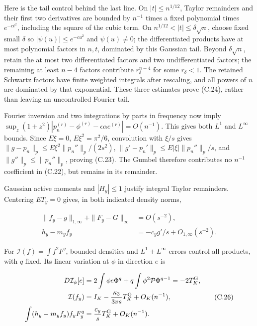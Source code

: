 \documentclass{article}
\begin{document}
Here is the tail control behind the last line. On \(|t|\le n^{1/12}\),
Taylor remainders and their first two derivatives are bounded by
\(n^{-1}\) times a fixed polynomial times \(e^{-ct^2}\), including the
square of the cubic term. On \(n^{1/12}<|t|\le\delta\sqrt n\), choose
fixed small \(\delta\) so \(|\psi(u)|\le e^{-cu^2}\) and
\(\psi(u)\ne0\); the differentiated products have at most polynomial
factors in \(n,t\), dominated by this Gaussian tail. Beyond
\(\delta\sqrt n\), retain the at most two differentiated factors and two
undifferentiated factors; the remaining at least \(n-4\) factors
contribute \(r_\delta^{n-4}\) for some \(r_\delta<1\). The retained
Schwartz factors have finite weighted integrals after rescaling, and all
powers of \(n\) are dominated by that exponential. These three estimates
prove (C.24), rather than leaving an uncontrolled Fourier tail.

Fourier inversion and two integrations by parts in frequency now imply
\(\sup_z(1+z^2)|p_n^{(r)}-\phi^{(r)}-\epsilon\alpha e^{(r)}|=O(n^{-1})\).
This gives both \(L^1\) and \(L^\infty\) bounds. Since \(E\xi=0\),
\(E\xi^2=\pi^2/6\), convolution with \(\xi/s\) gives
\(\|g-p_n\|_p\le E\xi^2\|p_n''\|_p/(2s^2)\),
\(\|g'-p_n'\|_p\le E|\xi|\|p_n''\|_p/s\), and
\(\|g''\|_p\le\|p_n''\|_p\), proving (C.23). The Gumbel therefore
contributes no \(n^{-1}\) coefficient in (C.22), but remains in its
remainder.

Gaussian active moments and \(|H_y|\le1\) justify integral Taylor
remainders. Centering \(ET_y=0\) gives, in both indicated density norms,

\[
\begin{aligned}
\|f_y-g\|_{1,\infty}+\|F_y-G\|_\infty&=O(s^{-2}),\\
h_y-m_yf_y&=-c_yg'/s+O_{1,\infty}(s^{-2}).
\end{aligned}
\tag{C.25}
\]

For \(\mathcal I(f)=\int f^2F^q\), bounded densities and
\(L^1+L^\infty\) errors control all products, with \(q\) fixed. Its
linear variation at \(\phi\) in direction \(e\) is

\[
\begin{aligned}
D\mathcal I_\phi[e]&=2\int\phi e\Phi^q+q\int\phi^2\mathcal P\Phi^{q-1}
=-2T_K^{\rm G},\\
\mathcal I(f_y)&=I_K-\frac{\kappa_3}{3vs}T_K^{\rm G}+O_K(n^{-1}),\\
\int(h_y-m_yf_y)f_yF_y^q&=\frac{c_y}{s}T_K^{\rm G}+O_K(n^{-1}).
\end{aligned}
\tag{C.26}
\]
\end{document}
